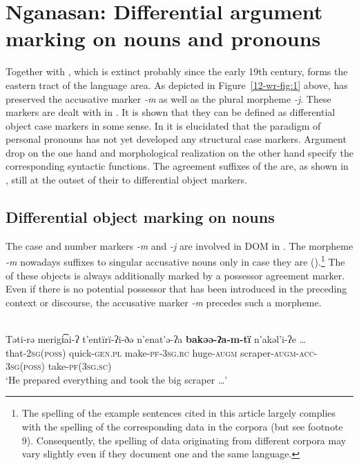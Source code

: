 \documentclass[output=paper]{LSP/langsci}
\begin{document}
\section{Nganasan: Differential argument marking on nouns and pronouns}
\label{12-wr-sec:3}

Together with , which is extinct probably since the early 19th century,  forms the eastern tract of the  language area. As depicted in Figure~\ref{12-wr-fig:1} above,  has preserved the  accusative marker \textit{-m} as well as the plural morpheme \textit{-j}. These markers are dealt with in . 
It is shown that they can be defined as differential object case markers in some sense. 
In  it is elucidated that the  paradigm of personal pronouns has not yet developed any structural case markers. 
Argument drop on the one hand and morphological realization on the other hand specify the corresponding syntactic functions. The agreement suffixes of the   are, as shown in , still at the outset of their  to differential object markers. 


\subsection{Differential object marking on nouns}\label{12-wr-sec:3-1}

The  case and number markers \textit{-m} and \textit{-j} are involved in DOM in . The morpheme \textit{-m} nowadays suffixes to  singular accusative nouns only in case they are  (\cf {}).\footnote{The spelling of the example sentences cited in this article largely complies with the spelling of the corresponding data in the corpora (but see footnote 9). 
Consequently, the spelling of data originating from different corpora may vary slightly even if they document one and the same language.} 
The  of these objects is always additionally marked by a possessor agreement marker. Even if there is no potential possessor that has been introduced in the preceding context or discourse, the accusative marker \textit{-m} precedes such a morpheme. 

\ea  \label{12-wr-ex:1}
\\
\ea \label{12-wr-ex:1a}
\gll Təti-rə merigi͡ai-ʔ t’entïrï-ʔi-ðə n’enat’ə-ʔa \textbf{bakəə-ʔa-m-tï} n’akəl’i-ʔe …\\
 that-\textsc{2sg(poss)} quick-\textsc{gen.pl} make-\textsc{pf-3sg.rc} huge-\textsc{augm} scraper-\textsc{augm-acc-3sg(poss)} take-\textsc{pf(3sg.sc)}\\
\glt ‘He prepared everything and took the big scraper …’  %
\end{document}
